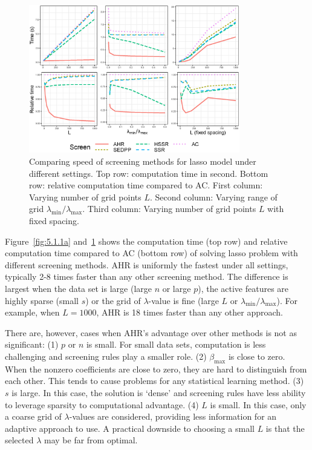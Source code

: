 \documentclass[]{interact}
\theoremstyle{plain}%
\theoremstyle{definition}
\theoremstyle{remark}
\providecommand{\lam}{\lambda}
\newcommand{\quotes}[1]{`#1'}
\begin{document}
\begin{figure}[h]
    \centering
    \includegraphics[width=0.82\textwidth]{511b.eps}    \caption{Comparing speed of screening methods for lasso model under different settings. Top row: computation time in second. Bottom row: relative computation time compared to AC. First column: Varying number of grid points $L$. Second column: Varying range of grid $\lambda_{\min}/\lambda_{\max}$. Third column: Varying number of grid points $L$ with fixed spacing.}
    \label{fig:5.1.1b}
\end{figure}

Figure~\ref{fig:5.1.1a} and~\ref{fig:5.1.1b} shows the computation time (top row) and relative computation time compared to AC (bottom row) of solving lasso problem with different screening methods. AHR is uniformly the fastest under all settings, typically 2-8 times faster than any other screening method. The difference is largest when the data set is large (large $n$ or large $p$), the active features are highly sparse (small $s$) or the grid of $\lambda$-value is fine (large $L$ or $\lambda_{\min}/\lambda_{\max}$). For example, when $L=1000$, AHR is 18 times faster than any other approach.

There are, however, cases when AHR's advantage over other methods is not as significant: (1) $p$ or $n$ is small. For small data sets, computation is less challenging and screening rules play a smaller role. (2) $\beta_{\max}$ is close to zero. When the nonzero coefficients are close to zero, they are hard to distinguish from each other. This tends to cause problems for any statistical learning method. (3) $s$ is large. In this case, the solution is \quotes{dense} and screening rules have less ability to leverage sparsity to computational advantage. (4) $L$ is small. In this case, only a coarse grid of $\lambda$-values are considered, providing less information for an adaptive approach to use. A practical downside to choosing a small $L$ is that the selected $\lam$ may be far from optimal.
\end{document}
